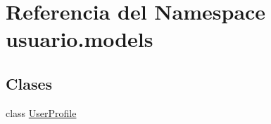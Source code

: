 \hypertarget{namespaceusuario_1_1models}{}\section{Referencia del Namespace usuario.\+models}
\label{namespaceusuario_1_1models}
\subsection*{Clases}
\begin{DoxyCompactItemize}
\item 
class \hyperlink{classusuario_1_1models_1_1_user_profile}{User\+Profile}
\end{DoxyCompactItemize}
